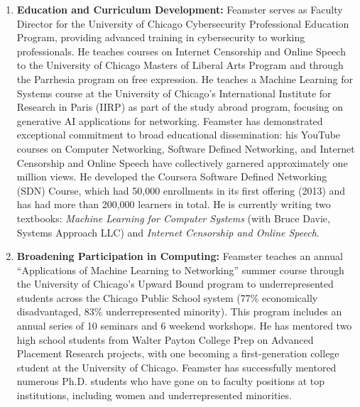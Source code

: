 \begin{enumerate}
    \item {\bf Education and Curriculum Development:} Feamster serves as Faculty Director for the University of Chicago Cybersecurity Professional Education Program, providing advanced training in cybersecurity to working professionals. He teaches courses on Internet Censorship and Online Speech to the University of Chicago Masters of Liberal Arts Program and through the Parrhesia program on free expression. He teaches a Machine Learning for Systems course at the University of Chicago's International Institute for Research in Paris (IIRP) as part of the study abroad program, focusing on generative AI applications for networking. Feamster has demonstrated exceptional commitment to broad educational dissemination: his YouTube courses on Computer Networking, Software Defined Networking, and Internet Censorship and Online Speech have collectively garnered approximately one million views. He developed the Coursera Software Defined Networking (SDN) Course, which had 50,000 enrollments in its first offering (2013) and has had more than 200,000 learners in total. He is currently writing two textbooks: {\em Machine Learning for Computer Systems} (with Bruce Davie, Systems Approach LLC) and {\em Internet Censorship and Online Speech}.

    \item {\bf Broadening Participation in Computing:} Feamster teaches an annual ``Applications of Machine Learning to Networking'' summer course through the University of Chicago's Upward Bound program to underrepresented students across the Chicago Public School system (77\% economically disadvantaged, 83\% underrepresented minority). This program includes an annual series of 10 seminars and 6 weekend workshops. He has mentored two high school students from Walter Payton College Prep on Advanced Placement Research projects, with one becoming a first-generation college student at the University of Chicago. Feamster has successfully mentored numerous Ph.D. students who have gone on to faculty positions at top institutions, including women and underrepresented minorities.
\end{enumerate}
